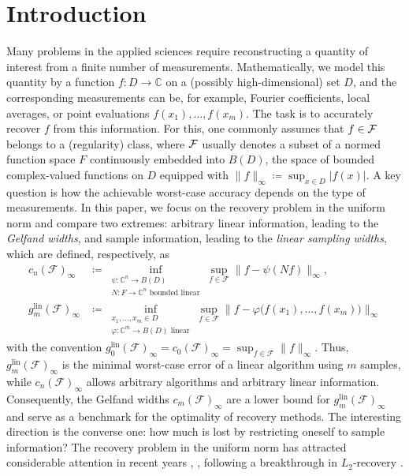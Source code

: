\documentclass[11pt,reqno, a4paper]{article}
\numberwithin{equation}{section}
\newcommand{\C}{\mathbb{C}}
\newcommand{\lin}{\ensuremath{\mathrm{lin}}}
\newcommand{\norm}[1]{\lVert #1\rVert}
\begin{document}
\section{Introduction}\label{sec:intro}
Many problems in the applied sciences require reconstructing a quantity of interest from a finite number of measurements.
Mathematically, we model this quantity by a function $f\colon D\to\C$ on a (possibly high-dimensional) set $D$, and the corresponding measurements can be, for example, Fourier coefficients, local averages, or point evaluations $f(x_1),\ldots,f(x_m)$.
The task is to accurately recover $f$ from this information.
For this, one commonly assumes that $f \in \cal F$ belongs to a (regularity) class, where $\cal F$ usually denotes a subset of a normed function space $F$ continuously embedded into $B(D)$, the space of bounded complex-valued functions on $D$ equipped with $\norm{f}_\infty \coloneqq \sup_{x\in D}|f(x)|$.
A key question is how the achievable worst-case accuracy depends on the type of measurements.
In this paper, we focus on the recovery problem in the uniform norm and compare two extremes: arbitrary linear information, leading to the \emph{Gelfand widths}, and sample information, leading to the \emph{linear sampling widths}, which are defined, respectively, as
\begin{align}
c_n(\mathcal{F})_\infty &\coloneqq \inf_{\substack{\psi\colon\C^n\to B(D)\\ N\colon F \to \C^n \text{ bounded linear}}}
\sup_{f\in \mathcal{F}}\norm{f-\psi(Nf)}_\infty,\\
g_m^{\lin}(\mathcal{F})_\infty &\coloneqq \inf_{\substack{x_1,\dots,x_m\in D\\ \varphi\colon \C^m\to B(D) \text{ linear}}}
\sup_{f\in \mathcal{F}} \bigl\| f-\varphi\bigl(f(x_1),\ldots,f(x_m)\bigr)\bigr\|_\infty \label{eq:glin}
\end{align}
with the convention $g_0^{\lin}(\mathcal{F})_\infty = c_0(\mathcal{F})_\infty =\sup_{f\in \mathcal{F}}\norm{f}_\infty$.
Thus, $g_m^{\lin}(\mathcal{F})_\infty$ is the minimal worst-case error of a linear algorithm using $m$ samples, while $c_n(\mathcal{F})_\infty$ allows arbitrary algorithms and arbitrary linear information.
Consequently, the Gelfand widths $c_m(\mathcal{F})_\infty$ are a lower bound for $g_m^{\lin}(\mathcal{F})_\infty$ and serve as a benchmark for the optimality of recovery methods.
The interesting direction is the converse one: how much is lost by restricting oneself to sample information?
The recovery problem in the uniform norm has attracted considerable attention in recent years \cite{PU}, \cite{KPUU23, KPUU24}, following a breakthrough in $L_2$-recovery \cite{NaSchul22, Te21, DoKrUl23}.
\end{document}
